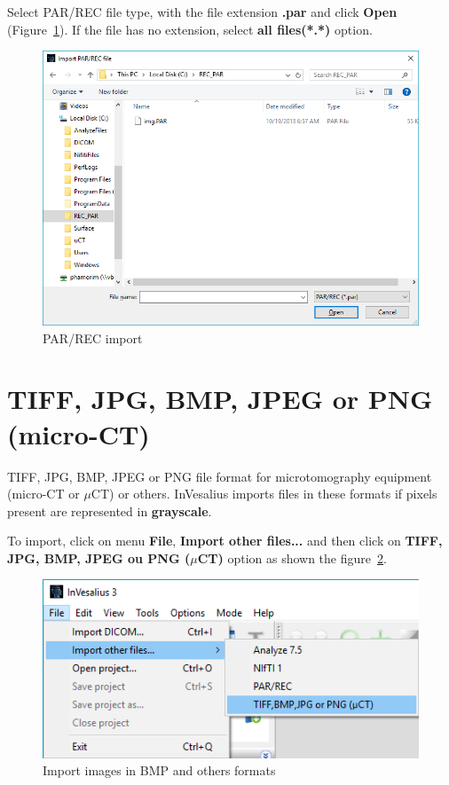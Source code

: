 Select PAR/REC file type, with the file extension \textbf{.par} and click \textbf{Open} (Figure~\ref{fig:import_parrec_window_pt}). If the file has no extension, select \textbf{all files(*.*)} option.

\begin{figure}[!htb]
\centering
\includegraphics[scale=0.4]{../user_guide_figures/invesalius_screen/import_parrec_window_en.png}
\caption{PAR/REC import}
\label{fig:import_parrec_window_pt}
\end{figure}

\section{TIFF, JPG, BMP, JPEG or PNG (micro-CT)}

TIFF, JPG, BMP, JPEG or PNG file format for microtomography equipment (micro-CT or $\mu$CT) or others. InVesalius imports files in these formats if pixels present are represented in \textbf{grayscale}.

To import, click on menu \textbf{File}, \textbf{Import other files...} and then click on \textbf{TIFF, JPG, BMP, JPEG ou PNG ($\mu$CT)} option as shown the figure~\ref{fig:import_bmp_menu_pt}.

\begin{figure}[!htb]
\centering
\includegraphics[scale=0.4]{../user_guide_figures/invesalius_screen/import_bmp_menu_en.png}
\caption{Import images in BMP and others formats}
\label{fig:import_bmp_menu_pt}
\end{figure}

